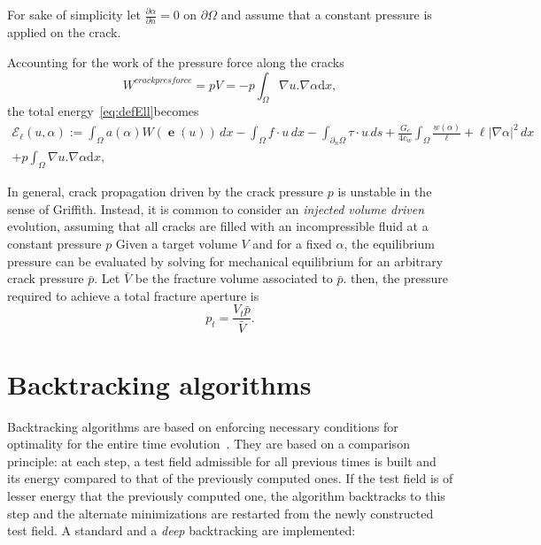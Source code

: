 \documentclass[10pt,oneside]{memoir}
\DeclareMathOperator{\e}{{\mathbf e}}
\begin{document}
For sake of simplicity let $\frac{\partial \alpha}{\partial n} = 0 $ on $\partial \Omega$ and assume that a constant pressure is applied on the crack.

Accounting for the work of the pressure force along the cracks
$$ W^{crack pres force} =  pV = - p \int_{\Omega} \nabla u . \nabla \alpha \mathrm{d}x,$$ 
the total energy~\eqref{eq:defEll}becomes
\begin{multline}
	\label{eq:defEll}
	\mathcal{E}_\ell(u,\alpha) := \int_\Omega a(\alpha) W(\e(u))\, dx - \int_\Omega f\cdot u \, dx - \int_{\partial_n \Omega} \tau \cdot u \, ds + \frac{G_c}{4c_w} \int_\Omega \frac{w(\alpha)}{\ell} + \ell|\nabla \alpha|^2\, dx \\
    + p \int_{\Omega} \nabla u . \nabla \alpha \mathrm{d}x,
\end{multline}

In general, crack propagation driven by the crack pressure $p$ is unstable in the sense of Griffith.
Instead, it is common to consider an \emph{injected volume driven} evolution, assuming that all cracks are filled with an incompressible fluid at a constant pressure $p$
Given a target volume $V$ and for a fixed $\alpha$, the equilibrium pressure can be evaluated by solving for mechanical equilibrium for an arbitrary crack pressure $\bar{p}$.
Let $\bar{V}$ be the fracture volume associated to $\bar{p}$.
then, the pressure required to achieve a total fracture aperture is
$$ p_t=\frac{V_t \bar{p}}{\bar{V}}.$$

%
%
%
%


\section{Backtracking algorithms}
\label{sec:BT}
Backtracking algorithms are based on enforcing necessary conditions for optimality for the entire time evolution~\cite{Bourdin-2007a}. They are based on a comparison principle: at each step, a test field admissible for all previous times is built and its energy compared to that of the previously computed ones. If the test field is of lesser energy that the previously computed one, the algorithm backtracks to this step and the alternate minimizations are restarted from the newly constructed test field. A standard and a \emph{deep} backtracking are implemented:
\end{document}
